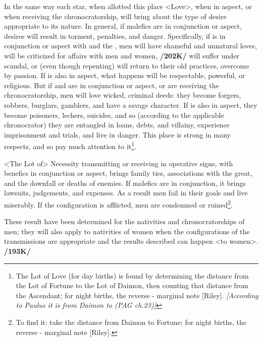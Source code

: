 In the same way each star, when allotted this place <Love>, when in aspect, or when receiving the chronocratorship, will bring about the type of desire appropriate to its nature. In general, if malefics are in conjunction or aspect, desires will result in torment, penalties, and danger. Specifically, if \Saturn\xspace is in conjunction or aspect with \Venus\xspace and the \Moon, men will have shameful and unnatural loves, will be criticized for affairs with men and women, \textbf{/202K/} will suffer under scandal, or (even though repenting) will return to their old practices, overcome by passion. If \Jupiter\xspace is also in aspect, what happens will be respectable, powerful, or religious. But if \Mars\xspace and \Mercury\xspace are in conjunction or aspect, or are receiving the chronocratorship, men will love wicked, criminal deeds: they become forgers, robbers, burglars, gamblers, and have a savage character. If \Venus\xspace is also in aspect, they become poisoners, lechers, suicides, and so (according to the applicable chronocrator) they are entangled in loans, debts, and villainy, experience imprisonment and trials, and live in danger. This place is strong in many respects, and so pay much attention to it\footnote{The Lot of Love (for day births) is found by determining the distance from the Lot of Fortune to the Lot of Daimon, then counting that distance from the Ascendant; for night births, the reverse - marginal note [Riley]. \textsl{[According to Paulus it is from Daimon to \Venus (PAG ch.23)]}}.

\enlargethispage{\baselineskip}
<The Lot of> Necessity  transmitting or receiving in operative signs, with benefics in conjunction or
aspect, brings family ties, associations with the great, and the downfall or deaths of enemies. If malefics are in conjunction, it brings lawsuits, judgements, and expenses. As a result men fail in their goals and live miserably. If the configuration is afflicted, men are condemned or ruined\footnote{To find it: take the distance from Daimon to Fortune; for night births, the reverse - marginal note [Riley].}.

These result have been determined for the nativities and chronocratorships of men; they will also apply to nativities of women when the configurations of the transmissions are appropriate and the results described can happen <to women>. \textbf{/193K/}

\newpage